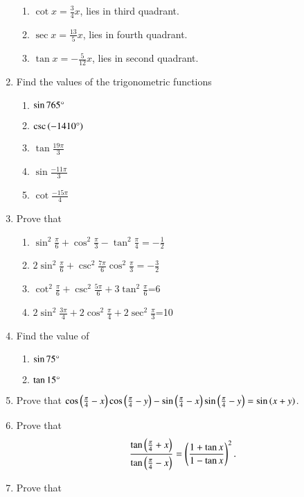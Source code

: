 \begin{enumerate}[label=\thesubsection.\arabic*,ref=\thesubsection.\theenumi,itemsep=1ex]
\begin{enumerate}
	\item $\cot x= \frac{3}{4}x$,  lies in third quadrant.
	\item $\sec x= \frac{13}{5}x$,  lies in fourth quadrant.
	\item $\tan x=-\frac{5}{12}x$,  lies in second quadrant.
\end{enumerate}
%
\item Find the values of the trigonometric functions
\begin{multicols}{2}
\begin{enumerate}
\item $\sin765\degree$
\item $\csc\left(-1410\degree\right)$
\item $\tan\frac{19\pi}{3}$
\item $\sin\frac{-11\pi}{3}$
\item $\cot\frac{-15\pi}{4}$
\end{enumerate}
\end{multicols}
%
\item Prove that
\begin{multicols}{2}
\begin{enumerate}
\item $\sin^{2}\frac{\pi}{6}+\cos^{2}\frac{\pi}{3}-\tan^{2}\frac{\pi}{4}=-\frac{1}{2}$
\item $2\sin^{2}\frac{\pi}{6}+\csc^{2}\frac{7\pi}{6}\cos^{2}\frac{\pi}{3}=-\frac{3}{2}$
\item $\cot^{2}\frac{\pi}{6}+\csc^{2}\frac{5\pi}{6}+3\tan^{2}\frac{\pi}{6}$=6
\item $2\sin^{2}\frac{3\pi}{4}+2\cos^{2}\frac{\pi}{4}+2\sec^{2}\frac{\pi}{3}$=10
\end{enumerate}
\end{multicols}
%
\item Find the value of
\begin{multicols}{2}
\begin{enumerate}
\item$\sin75\degree$
\item $\tan15\degree$
\end{enumerate}
\end{multicols}
%
\item Prove that 
 $\cos\left(\frac{\pi}{4}-x\right)\cos\left(\frac{\pi}{4}-y\right)-\sin\left(\frac{\pi}{4}-x\right)\sin\left(\frac{\pi}{4}-y\right)=\sin\left(x+y\right)$.
%
\item Prove that 
$$\frac{\tan\left(\frac{\pi}{4}+x\right)}{\tan\left(\frac{\pi}{4}-x\right)}=\left(\frac{1+\tan x}{1-\tan x}\right)^{2}.$$
%
\item Prove that

\end{enumerate}
